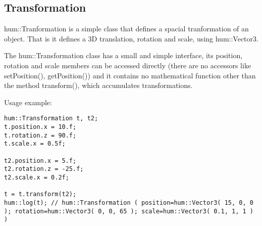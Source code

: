 \subsection{Transformation}

hum::Tranformation is a simple class that defines a spacial tranformation
of an object. That is it defines a 3D translation, rotation and scale, using
hum::Vector3.

The hum::Transformation class has a small and simple interface, its
position, rotation and scale members can be accessed directly
(there are no accessors like setPosition(), getPosition()) and it
contains no mathematical function other than the method transform(), which
accumulates transformations.

Usage example:
\begin{lstlisting}[caption=Tranformation example]
hum::Transformation t, t2;
t.position.x = 10.f;
t.rotation.z = 90.f;
t.scale.x = 0.5f;

t2.position.x = 5.f;
t2.rotation.z = -25.f;
t2.scale.x = 0.2f;

t = t.transform(t2);
hum::log(t); // hum::Transformation ( position=hum::Vector3( 15, 0, 0 ); rotation=hum::Vector3( 0, 0, 65 ); scale=hum::Vector3( 0.1, 1, 1 ) )
\end{lstlisting}
